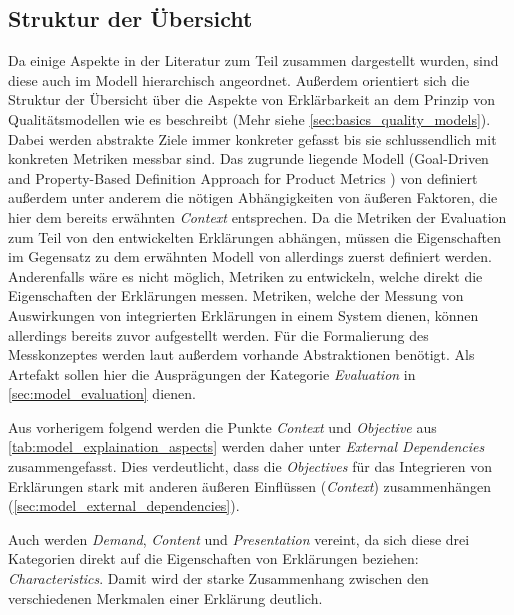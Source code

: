 \subsection{Struktur der Übersicht}

Da einige Aspekte in der Literatur zum Teil zusammen dargestellt wurden, sind diese auch im Modell hierarchisch angeordnet. Außerdem orientiert sich die Struktur der Übersicht über die Aspekte von Erklärbarkeit an dem Prinzip von Qualitätsmodellen wie es \citeauthor{schneider2012abenteuer} beschreibt \cite{schneider2012abenteuer} (Mehr siehe \autoref{sec:basics_quality_models}). Dabei werden abstrakte Ziele immer konkreter gefasst bis sie schlussendlich mit konkreten Metriken messbar sind. Das zugrunde liegende Modell (\glqq Goal-Driven and Property-Based Definition Approach for Product Metrics\grqq{} \cite{briand1995goal}) von \citeauthor{briand1995goal} definiert außerdem unter anderem die nötigen Abhängigkeiten von äußeren Faktoren, die hier dem bereits erwähnten \textit{Context} entsprechen. Da die Metriken der Evaluation zum Teil von den entwickelten Erklärungen abhängen, müssen die Eigenschaften im Gegensatz zu dem erwähnten Modell von \citeauthor{schneider2012abenteuer} allerdings zuerst definiert werden. Anderenfalls wäre es nicht möglich, Metriken zu entwickeln, welche direkt die Eigenschaften der Erklärungen messen. Metriken, welche der Messung von Auswirkungen von integrierten Erklärungen in einem System dienen, können allerdings bereits zuvor aufgestellt werden. Für die Formalierung des Messkonzeptes werden laut \citeauthor{briand1995goal} außerdem vorhande Abstraktionen benötigt. Als Artefakt sollen hier die Ausprägungen der Kategorie \textit{Evaluation} in \autoref{sec:model_evaluation} dienen.

\smallbreak

Aus vorherigem folgend werden die Punkte \textit{Context} und \textit{Objective} aus \autoref{tab:model_explaination_aspects} werden daher unter \textit{External Dependencies} zusammengefasst. Dies verdeutlicht, dass die \textit{Objectives} für das Integrieren von Erklärungen stark mit anderen äußeren Einflüssen (\textit{Context}) zusammenhängen (\autoref{sec:model_external_dependencies}).

Auch werden \textit{Demand}, \textit{Content} und \textit{Presentation} vereint, da sich diese drei Kategorien direkt auf die Eigenschaften von Erklärungen beziehen: \textit{Characteristics}. Damit wird der starke Zusammenhang zwischen den verschiedenen Merkmalen einer Erklärung deutlich.

